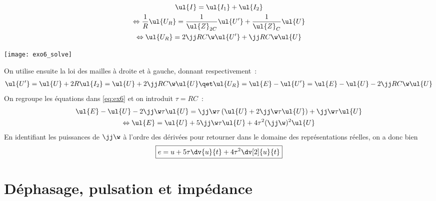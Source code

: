 \documentclass[a4paper, 12pt, final, garamond]{book}
\begin{document}
\begin{minipage}{0.70\linewidth}
	\begin{gather}
		\nonumber
		\ul{I} = \ul{I_1} + \ul{I_2}\\
		\nonumber
		\Leftrightarrow
		\frac{1}{R}\ul{U_R} = \frac{1}{\ul{Z}_{2C}}\ul{U'} + \frac{1}{\ul{Z}_C}\ul{U}\\
		\label{eq:ex6}
		\Leftrightarrow
		\ul{U_R} = 2\jj RC\w\ul{U'} + \jj RC\w\ul{U}
	\end{gather}
\end{minipage}
\begin{minipage}{0.30\linewidth}
	\centering
	\texttt{[image: exo6\_solve]}
\end{minipage}
On utilise ensuite la loi des mailles à droite et à gauche, donnant
respectivement~:
\begin{gather*}
	\ul{U'} = \ul{U} + 2R\ul{I_2} = \ul{U} + 2\jj RC\w\ul{U}
	\qet
	\ul{U_R} = \ul{E} - \ul{U'} = \ul{E} - \ul{U} - 2\jj RC\w\ul{U}
\end{gather*}
On regroupe les équations dans \ref{eq:ex6} et on introduit $\tau = RC$~:
\begin{gather*}
	\ul{E} - \ul{U} - 2\jj\w\tau\ul{U} = \jj\w\tau \left( \ul{U} +
	2\jj\w\tau\ul{U} \right) + \jj\w\tau\ul{U}\\
	\Leftrightarrow
	\ul{E} = \ul{U} + 5\jj\w\tau\ul{U} + 4\tau^2 (\jj\w)^2\ul{U}
\end{gather*}
En identifiant les puissances de $\jj\w$ à l'ordre des dérivées pour retourner
dans le domaine des représentations réelles, on a donc bien
\begin{gather*}
	\boxed{
		e = u + 5\tau \dv{u}{t} + 4\tau^2 \dv[2]{u}{t}}
\end{gather*}
\relax
\section{Déphasage, pulsation et impédance}
\end{document}
